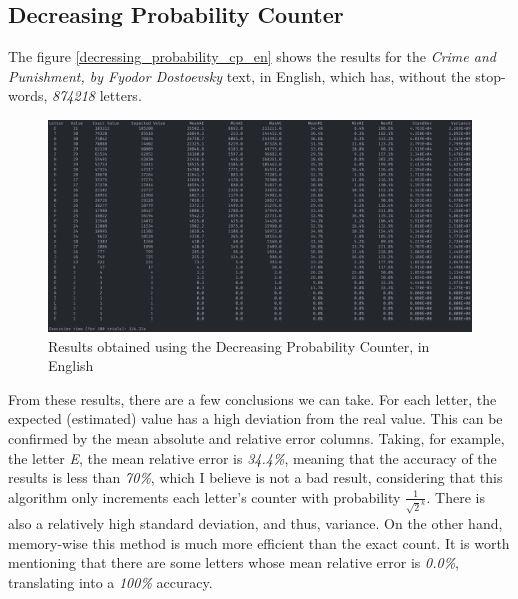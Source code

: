 \documentclass[...]{revdetua}
\begin{document}
\subsection{Decreasing Probability Counter}

The figure \ref{decressing_probability_cp_en} shows the results for the \textit{Crime and Punishment, by Fyodor Dostoevsky} text, in English, which has, without the stop-words, \textit{874218} letters.

\begin{figure}[!htb]
    \centering
    \includegraphics[width=1\columnwidth]{./figures/decressing_probability_cp_en.png}
    \caption{Results obtained using the Decreasing Probability Counter, in English\label{decressing_probability_cp_en}}
    \label{fig: decressing_probability_cp_en}
\end{figure}

From these results, there are a few conclusions we can take. For each letter, the expected (estimated) value has a high deviation from the real value. This can be confirmed by the mean absolute and relative error columns. Taking, for example, the letter \textit{E}, the mean relative error is \textit{34.4\%}, meaning that the accuracy of the results is less than \textit{70\%}, which I believe is not a bad result, considering that this algorithm only increments each letter's counter with probability \(\frac{1}{\sqrt{2}^k}\). There is also a relatively high standard deviation, and thus, variance. On the other hand, memory-wise this method is much more efficient than the exact count. It is worth mentioning that there are some letters whose mean relative error is \textit{0.0\%}, translating into a \textit{100\%} accuracy.
\end{document}
